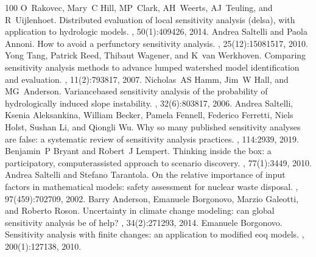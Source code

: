 \documentclass[letterpaper,10pt,english]{sphinxmanual}
\begin{document}
\begin{sphinxthebibliography}{100}
\sphinxAtStartPar
O Rakovec, Mary C Hill, MP Clark, AH Weerts, AJ Teuling, and R Uijlenhoet. Distributed evaluation of local sensitivity analysis (delsa), with application to hydrologic models. , 50(1):409\textendash{}426, 2014.
\sphinxAtStartPar
Andrea Saltelli and Paola Annoni. How to avoid a perfunctory sensitivity analysis. , 25(12):1508\textendash{}1517, 2010.
\sphinxAtStartPar
Yong Tang, Patrick Reed, Thibaut Wagener, and K van Werkhoven. Comparing sensitivity analysis methods to advance lumped watershed model identification and evaluation. , 11(2):793\textendash{}817, 2007.
\sphinxAtStartPar
Nicholas AS Hamm, Jim W Hall, and MG Anderson. Variance\sphinxhyphen{}based sensitivity analysis of the probability of hydrologically induced slope instability. , 32(6):803\textendash{}817, 2006.
\sphinxAtStartPar
Andrea Saltelli, Ksenia Aleksankina, William Becker, Pamela Fennell, Federico Ferretti, Niels Holst, Sushan Li, and Qiongli Wu. Why so many published sensitivity analyses are false: a systematic review of sensitivity analysis practices. , 114:29\textendash{}39, 2019.
\sphinxAtStartPar
Benjamin P Bryant and Robert J Lempert. Thinking inside the box: a participatory, computer\sphinxhyphen{}assisted approach to scenario discovery. , 77(1):34\textendash{}49, 2010.
\sphinxAtStartPar
Andrea Saltelli and Stefano Tarantola. On the relative importance of input factors in mathematical models: safety assessment for nuclear waste disposal. , 97(459):702\textendash{}709, 2002.
\sphinxAtStartPar
Barry Anderson, Emanuele Borgonovo, Marzio Galeotti, and Roberto Roson. Uncertainty in climate change modeling: can global sensitivity analysis be of help? , 34(2):271\textendash{}293, 2014.
\sphinxAtStartPar
Emanuele Borgonovo. Sensitivity analysis with finite changes: an application to modified eoq models. , 200(1):127\textendash{}138, 2010.

\end{sphinxthebibliography}
\end{document}
